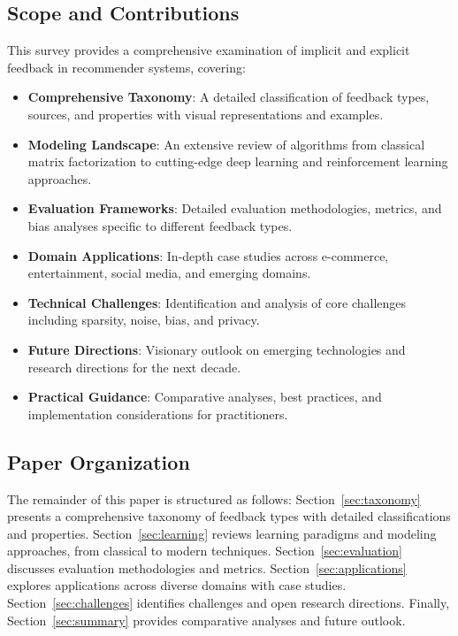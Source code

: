 \documentclass[acmsmall,review,anonymous]{acmart}
\begin{document}
\subsection{Scope and Contributions}

This survey provides a comprehensive examination of implicit and explicit feedback in recommender systems, covering:

\begin{itemize}
    \item \textbf{Comprehensive Taxonomy}: A detailed classification of feedback types, sources, and properties with visual representations and examples.

    \item \textbf{Modeling Landscape}: An extensive review of algorithms from classical matrix factorization to cutting-edge deep learning and reinforcement learning approaches.

    \item \textbf{Evaluation Frameworks}: Detailed evaluation methodologies, metrics, and bias analyses specific to different feedback types.

    \item \textbf{Domain Applications}: In-depth case studies across e-commerce, entertainment, social media, and emerging domains.

    \item \textbf{Technical Challenges}: Identification and analysis of core challenges including sparsity, noise, bias, and privacy.

    \item \textbf{Future Directions}: Visionary outlook on emerging technologies and research directions for the next decade.

    \item \textbf{Practical Guidance}: Comparative analyses, best practices, and implementation considerations for practitioners.
\end{itemize}

\subsection{Paper Organization}

The remainder of this paper is structured as follows: Section~\ref{sec:taxonomy} presents a comprehensive taxonomy of feedback types with detailed classifications and properties. Section~\ref{sec:learning} reviews learning paradigms and modeling approaches, from classical to modern techniques. Section~\ref{sec:evaluation} discusses evaluation methodologies and metrics. Section~\ref{sec:applications} explores applications across diverse domains with case studies. Section~\ref{sec:challenges} identifies challenges and open research directions. Finally, Section~\ref{sec:summary} provides comparative analyses and future outlook.
\end{document}
